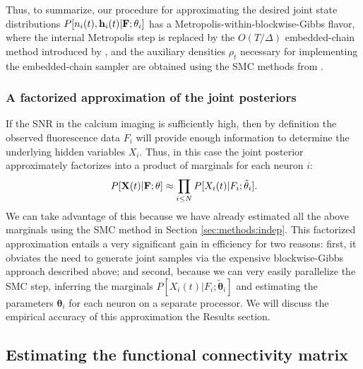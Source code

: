 \documentclass[aoas,preprint]{imsart}
\newcommand{\bth}{\mathbf{\theta}}
\newcommand{\bF}{{\bf F}}
\newcommand{\bX}{{\bf X}}
\newcommand{\bh}{\mathbf{h}}
\newcommand{\tbth}{\tilde{\bth}}
\begin{document}
Thus, to summarize, our procedure for approximating the desired joint state distributions $P[n_i(t), \bh_i(t) | \bF;\bth_i]$ has a Metropolis-within-blockwise-Gibbs flavor, where the internal Metropolis step is replaced by the $O(T/\Delta)$ embedded-chain method introduced by \cite{NBR03}, and the auxiliary densities $\rho_t$ necessary for implementing the embedded-chain sampler are obtained using the SMC methods from \cite{Vogelstein2009}.

\subsubsection{A factorized approximation of the joint posteriors}
\label{sec:cheaper-high-snr}

If the SNR in the calcium imaging is sufficiently high, then by definition the observed fluorescence data $F_i$ will provide enough information to determine the underlying hidden variables $X_i$. Thus, in this case the joint posterior approximately factorizes into a product of marginals for each neuron $i$:
\begin{equation} \label{eqn:indep_approx}
  P[\bX(t)|\bF;\bth] \approx \prod_{i\leq N} P[X_i(t)|F_i;\tbth_i].
\end{equation}
We can take advantage of this because we have already estimated all the above marginals using the SMC method in Section \ref{sec:methods:indep}. %
This factorized approximation entails a very significant gain in efficiency for two reasons: first, it obviates the need to generate joint samples via the expensive blockwise-Gibbs approach described above; and second, because we can very easily parallelize the SMC step, inferring the marginals $P[X_i(t) | F_i; \tbth_i]$ and estimating the parameters $\bth_i$ for each neuron on a separate processor. We will discuss the empirical accuracy of this approximation the Results section.

\subsection{Estimating the functional connectivity matrix} \label{sec:methods:parameters HMM}
\end{document}
